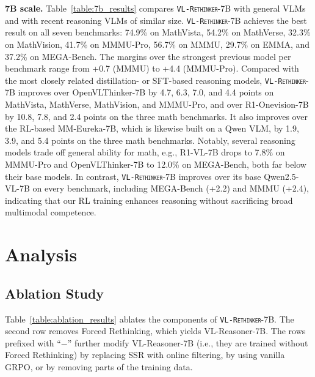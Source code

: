 \documentclass{article}
\newcommand{\model}{\texttt{\textsc{VL-Rethinker}}\xspace}
\begin{document}
\textbf{7B scale.} Table~\ref{table:7b_results} compares \model-7B with general VLMs and with recent reasoning VLMs of similar size. \model-7B achieves the best result on all seven benchmarks: 74.9\% on MathVista, 54.2\% on MathVerse, 32.3\% on MathVision, 41.7\% on MMMU-Pro, 56.7\% on MMMU, 29.7\% on EMMA, and 37.2\% on MEGA-Bench. The margins over the strongest previous model per benchmark range from +0.7 (MMMU) to +4.4 (MMMU-Pro). Compared with the most closely related distillation- or SFT-based reasoning models, \model-7B improves over OpenVLThinker-7B by 4.7, 6.3, 7.0, and 4.4 points on MathVista, MathVerse, MathVision, and MMMU-Pro, and over R1-Onevision-7B by 10.8, 7.8, and 2.4 points on the three math benchmarks. It also improves over the RL-based MM-Eureka-7B, which is likewise built on a Qwen VLM, by 1.9, 3.9, and 5.4 points on the three math benchmarks. Notably, several reasoning models trade off general ability for math, e.g., R1-VL-7B drops to 7.8\% on MMMU-Pro and OpenVLThinker-7B to 12.0\% on MEGA-Bench, both far below their base models. In contrast, \model-7B improves over its base Qwen2.5-VL-7B on every benchmark, including MEGA-Bench (+2.2) and MMMU (+2.4), indicating that our RL training enhances reasoning without sacrificing broad multimodal competence.

\section{Analysis}
\label{sec:analysis}

\subsection{Ablation Study}
\label{sec:ablation}

Table~\ref{table:ablation_results} ablates the components of \model-7B. The second row removes Forced Rethinking, which yields VL-Reasoner-7B. The rows prefixed with ``$-$'' further modify VL-Reasoner-7B (i.e., they are trained without Forced Rethinking) by replacing SSR with online filtering, by using vanilla GRPO, or by removing parts of the training data.
\end{document}
